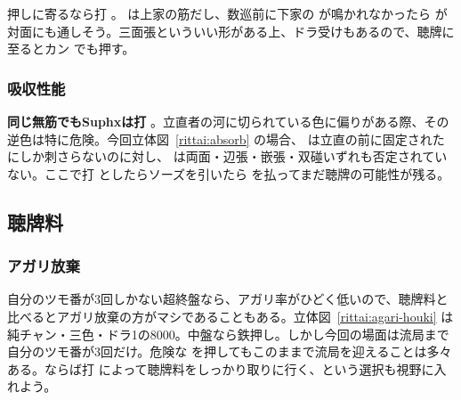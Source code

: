 \documentclass[../nankiru_main.tex]{subfiles}
\begin{document}
押しに寄るなら打 。 は上家の筋だし、数巡前に下家の  が鳴かれなかったら  が対面にも通しそう。三面張といういい形がある上、ドラ受けもあるので、聴牌に至るとカン  でも押す\citep[][pp.~102--105]{doi}。


\subsubsection*{吸収性能}

\begin{rittai}[hbt]
  \centering
  
  
  \caption{親の立直を受けている場面}
  \label{rittai:absorb}
\end{rittai}

\textbf{同じ無筋でもSuphxは打 }\citep[][pp.~54--55]{suphx}。立直者の河に切られている色に偏りがある際、その逆色は特に危険。今回立体図~\ref{rittai:absorb} の場合、 は立直の前に固定された  にしか刺さらないのに対し、 は両面・辺張・嵌張・双碰いずれも否定されていない。ここで打  としたらソーズを引いたら  を払ってまだ聴牌の可能性が残る。


\subsection{聴牌料}

\subsubsection{アガリ放棄}

自分のツモ番が3回しかない超終盤なら、アガリ率がひどく低いので、聴牌料と比べるとアガリ放棄の方がマシであることもある。立体図~\ref{rittai:agari-houki} は純チャン・三色・ドラ1の8000。中盤なら鉄押し。しかし今回の場面は流局まで自分のツモ番が3回だけ。危険な  を押してもこのままで流局を迎えることは多々ある。ならば打  によって聴牌料をしっかり取りに行く、という選択も視野に入れよう\citep[][pp.~98--99]{doi}。
\end{document}
